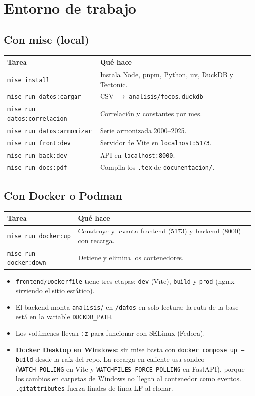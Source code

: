 \documentclass[11pt,a4paper]{article}
\begin{document}
\section{Entorno de trabajo}

\subsection*{Con mise (local)}
\begin{tabularx}{\linewidth}{@{}lX@{}}
\toprule
Tarea & Qué hace \\
\midrule
\texttt{mise install} & Instala Node, pnpm, Python, uv, DuckDB y Tectonic. \\
\texttt{mise run datos:cargar} & CSV $\to$ \texttt{analisis/focos.duckdb}. \\
\texttt{mise run datos:correlacion} & Correlación y constantes por mes. \\
\texttt{mise run datos:armonizar} & Serie armonizada 2000--2025. \\
\texttt{mise run front:dev} & Servidor de Vite en \texttt{localhost:5173}. \\
\texttt{mise run back:dev} & API en \texttt{localhost:8000}. \\
\texttt{mise run docs:pdf} & Compila los \texttt{.tex} de \texttt{documentacion/}. \\
\bottomrule
\end{tabularx}

\subsection*{Con Docker o Podman}
\begin{tabularx}{\linewidth}{@{}lX@{}}
\toprule
Tarea & Qué hace \\
\midrule
\texttt{mise run docker:up} & Construye y levanta frontend (5173) y backend (8000) con recarga. \\
\texttt{mise run docker:down} & Detiene y elimina los contenedores. \\
\bottomrule
\end{tabularx}

\begin{itemize}
  \item \texttt{frontend/Dockerfile} tiene tres etapas: \texttt{dev} (Vite), \texttt{build}
        y \texttt{prod} (nginx sirviendo el sitio estático).
  \item El backend monta \texttt{analisis/} en \texttt{/datos} en solo lectura; la ruta de la
        base está en la variable \texttt{DUCKDB\_PATH}.
  \item Los volúmenes llevan \texttt{:z} para funcionar con SELinux (Fedora).
  \item \textbf{Docker Desktop en Windows:} sin mise basta con
        \texttt{docker compose up --build} desde la raíz del repo. La recarga en caliente
        usa sondeo (\texttt{WATCH\_POLLING} en Vite y \texttt{WATCHFILES\_\allowbreak FORCE\_\allowbreak POLLING} en
        FastAPI), porque los cambios en carpetas de Windows no llegan al contenedor como
        eventos. \texttt{.gitattributes} fuerza finales de línea LF al clonar.
\end{itemize}
\end{document}
